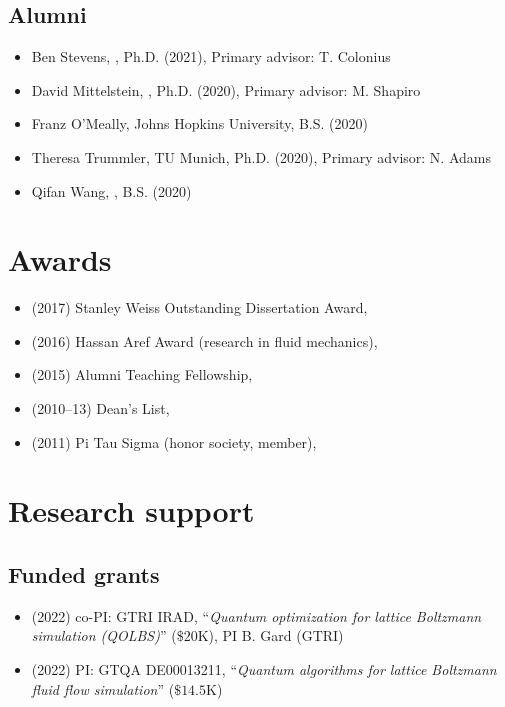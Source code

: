 \subsection{Alumni}

\begin{itemize}
    \item Ben Stevens, \CIT, Ph.D. (2021), Primary advisor: T. Colonius
    \item David Mittelstein, \CIT, Ph.D. (2020), Primary advisor: M. Shapiro
    \item Franz O'Meally, Johns Hopkins University, B.S. (2020)
    \item Theresa Trummler, TU Munich, Ph.D. (2020), Primary advisor: N. Adams
    \item Qifan Wang, \CIT, B.S. (2020)
\end{itemize}

\section{Awards}

\begin{itemize}
    \item (2017) Stanley Weiss Outstanding Dissertation Award, \UIUC
    \item (2016) Hassan Aref Award (research in fluid mechanics), \UIUC
    \item (2015) Alumni Teaching Fellowship, \UIUC
    \item (2010--13) Dean's List, \UMD
    \item (2011) Pi Tau Sigma (honor society, member), \UMD
\end{itemize}

\section{Research support}

\subsection{Funded grants}

\begin{itemize}
    \item (2022) co-PI: GTRI IRAD, ``\textit{Quantum optimization for lattice Boltzmann simulation (QOLBS)}'' ($\$20$K), PI B. Gard (GTRI)
    \item (2022) PI: GTQA DE00013211, ``\textit{Quantum algorithms for lattice Boltzmann fluid flow simulation}'' ($\$14.5$K)
\end{itemize}


